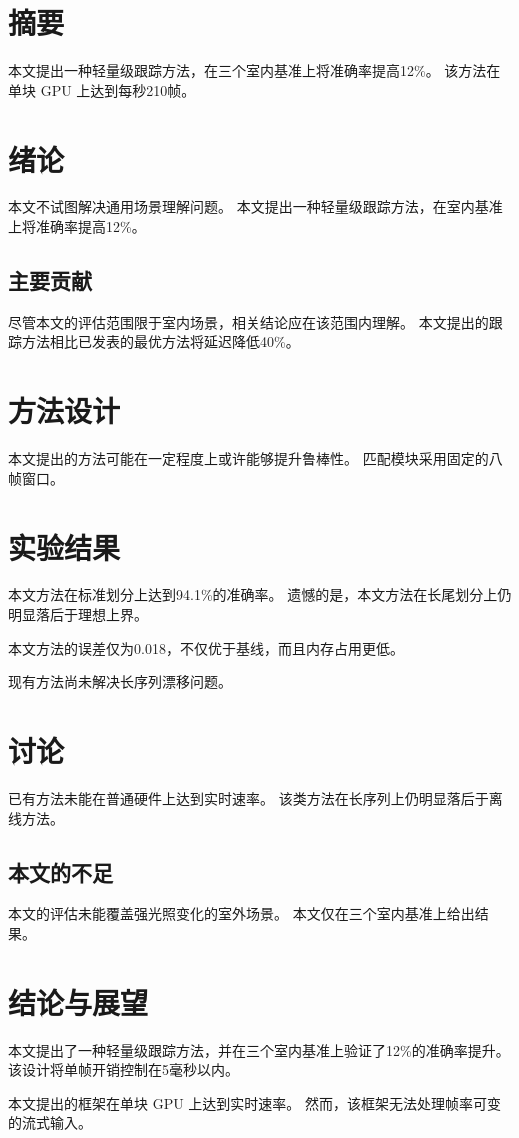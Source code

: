 \documentclass{ctexart}
\begin{document}
\chapter{摘要}
本文提出一种轻量级跟踪方法，在三个室内基准上将准确率提高12\%。
该方法在单块 GPU 上达到每秒210帧。

\chapter{绪论}
本文不试图解决通用场景理解问题。
本文提出一种轻量级跟踪方法，在室内基准上将准确率提高12\%。

\section{主要贡献}
尽管本文的评估范围限于室内场景，相关结论应在该范围内理解。
本文提出的跟踪方法相比已发表的最优方法将延迟降低40\%。

\chapter{方法设计}
本文提出的方法可能在一定程度上或许能够提升鲁棒性。
匹配模块采用固定的八帧窗口。

\chapter{实验结果}
本文方法在标准划分上达到94.1\%的准确率。
遗憾的是，本文方法在长尾划分上仍明显落后于理想上界。

本文方法的误差仅为0.018，不仅优于基线，而且内存占用更低。

现有方法尚未解决长序列漂移问题。

\chapter{讨论}
已有方法\cite{tracker2019}未能在普通硬件上达到实时速率。
该类方法在长序列上仍明显落后于离线方法。

\section{本文的不足}
本文的评估未能覆盖强光照变化的室外场景。
本文仅在三个室内基准上给出结果。

\chapter{结论与展望}
本文提出了一种轻量级跟踪方法，并在三个室内基准上验证了12\%的准确率提升。
该设计将单帧开销控制在5毫秒以内。

本文提出的框架在单块 GPU 上达到实时速率。
然而，该框架无法处理帧率可变的流式输入。
\end{document}

